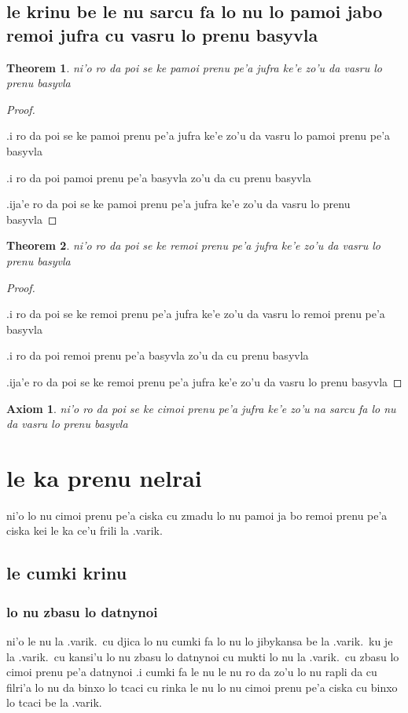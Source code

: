 \documentclass{article}
\newtheorem{thm}{Theorem}
\newtheorem{axiom}{Axiom}
\begin{document}
\subsection{le krinu be le nu sarcu fa lo nu lo pamoi jabo remoi jufra cu vasru lo prenu basyvla}
\begin{thm}
	ni'o ro da poi se ke pamoi prenu pe'a jufra ke'e zo'u da vasru lo prenu basyvla
\end{thm}
\begin{proof}
	${}$

	.i ro da poi se ke pamoi prenu pe'a jufra ke'e zo'u da vasru lo pamoi prenu pe'a basyvla

	.i ro da poi pamoi prenu pe'a basyvla zo'u da cu prenu basyvla

	.ija'e ro da poi se ke pamoi prenu pe'a jufra ke'e zo'u da vasru lo prenu basyvla
\end{proof}
\begin{thm}
	ni'o ro da poi se ke remoi prenu pe'a jufra ke'e zo'u da vasru lo prenu basyvla
\end{thm}
\begin{proof}
	${ }$

	.i ro da poi se ke remoi prenu pe'a jufra ke'e zo'u da vasru lo remoi prenu pe'a basyvla

	.i ro da poi remoi prenu pe'a basyvla zo'u da cu prenu basyvla

	.ija'e ro da poi se ke remoi prenu pe'a jufra ke'e zo'u da vasru lo prenu basyvla
\end{proof}
\begin{axiom}
	ni'o ro da poi se ke cimoi prenu pe'a jufra ke'e zo'u na sarcu fa lo nu da vasru lo prenu basyvla
\end{axiom}

\section{le ka prenu nelrai}
ni'o lo nu cimoi prenu pe'a ciska cu zmadu lo nu pamoi ja bo remoi prenu pe'a ciska kei le ka ce'u frili la .varik.

\subsection{le cumki krinu}

\subsubsection{lo nu zbasu lo datnynoi}
ni'o le nu la .varik.\ cu djica lo nu cumki fa lo nu lo jibykansa be la .varik.\ ku je la .varik.\ cu kansi'u lo nu zbasu lo datnynoi cu mukti lo nu la .varik.\ cu zbasu lo cimoi prenu pe'a datnynoi  .i cumki fa le nu le nu ro da zo'u lo nu rapli da cu filri'a lo nu da binxo lo tcaci cu rinka le nu lo nu cimoi prenu pe'a ciska cu binxo lo tcaci be la .varik.
\end{document}
